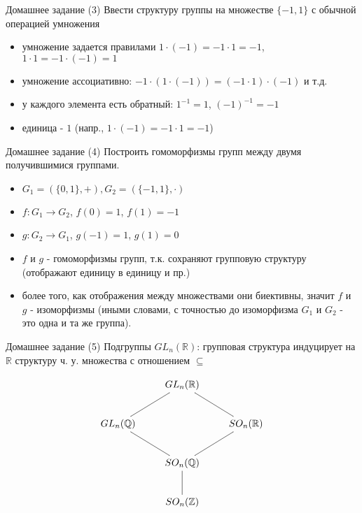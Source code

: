 \documentclass{beamer}
\begin{document}
\begin{frame}{Домашнее задание (3)}
Ввести структуру группы на множестве $\{-1, 1\}$ с обычной операцией умножения\\
  \begin{itemize}
    \item умножение задается правилами $1 \cdot (-1) = -1 \cdot 1 = -1$, $1 \cdot 1 = -1 \cdot (-1) = 1$ 
    \item умножение ассоциативно: $-1 \cdot (1 \cdot (-1)) = (-1 \cdot 1) \cdot (-1)$ и т.д.
    \item у каждого элемента есть обратный: $1^{-1} = 1$, $(-1)^{-1} = -1$
    \item единица - $1$ (напр., $1 \cdot (-1) = -1 \cdot 1 = -1$)
  \end{itemize}  
\end{frame}

\begin{frame}{Домашнее задание (4)}
Построить гомоморфизмы групп между двумя получившимися группами.
  \begin{itemize}
    \item $G_1 = (\{0, 1\}, +), G_2 = (\{-1, 1\}, \cdot)$
    \item $f : G_1 \to G_2$, $f(0) = 1$, $f(1) = -1$
    \item $g : G_2 \to G_1$, $g(-1) = 1$, $g(1) = 0$
    \item $f$ и $g$ - гомоморфизмы групп, т.к. сохраняют групповую структуру (отображают единицу в единицу и пр.)
    \item более того, как отображения между множествами они биективны, значит $f$ и $g$ - изоморфизмы (иными словами, с точностью до изоморфизма $G_1$ и $G_2$ - это одна и та же группа).
  \end{itemize}  
\end{frame}

\begin{frame}{Домашнее задание (5)}
Подгруппы $GL_n(\mathbb{R})$: групповая структура индуцирует на $\mathbb{R}$ структуру ч. у. множества с отношением $\subseteq$
  \begin{center}
\[
\xymatrix{
     & GL_n(\mathbb{R}) \ar@{-}[ld] \ar@{-}[rd] & \\
     GL_n(\mathbb{Q}) \ar@{-}[rd] & & SO_n(\mathbb{R}) \ar@{-}[ld] \\
     & SO_n(\mathbb{Q}) \ar@{-}[d] & \\
     & SO_n(\mathbb{Z}) &
     }
     \]
  \end{center}  
\end{frame}
\end{document}
